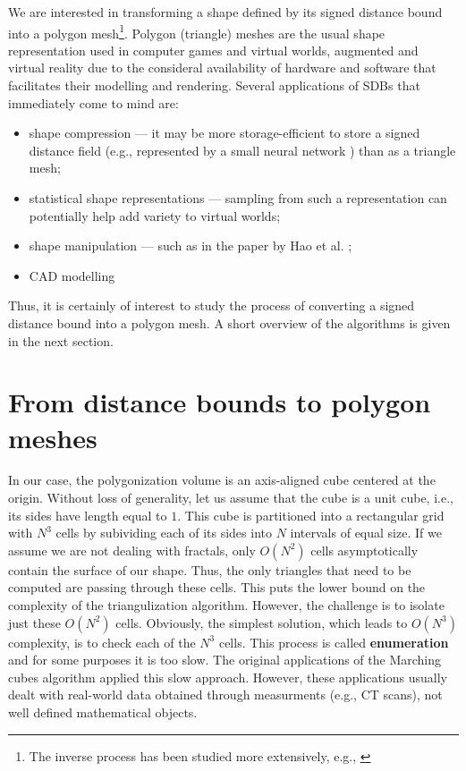 \documentclass[11pt,twocolumn]{article}
\begin{document}
		We are interested in transforming a shape defined by its signed distance bound into a polygon mesh\footnote{The inverse process has been studied more extensively, e.g., \cite{DoubleLayerSDF,GenShapeCVPR2019}}.
		Polygon (triangle) meshes are the usual shape representation used in computer games and virtual worlds, augmented and virtual reality due to the consideral availability of hardware and software that facilitates their modelling and rendering.
		Several applications of SDBs that immediately come to mind are:
		\begin{itemize}
			\item
				shape compression --- it may be more storage-efficient to store a signed distance field (e.g., represented by a small neural network \cite{davies2020overfit}) than as a triangle mesh;
			\item
				statistical shape representations --- sampling from such a representation \cite{GenShapeCVPR2019} can potentially help add variety to virtual worlds;
			\item
				shape manipulation --- such as in the paper by Hao et al. \cite{hao2020dualsdf};
			\item
				CAD modelling
		\end{itemize}
		Thus, it is certainly of interest to study the process of converting a signed distance bound into a polygon mesh.
		A short overview of the algorithms is given in the next section.

	\section{From distance bounds to polygon meshes}\label{sec:overview}
		In our case, the polygonization volume is an axis-aligned cube centered at the origin.
		Without loss of generality, let us assume that the cube is a unit cube, i.e., its sides have length equal to $1$.
		This cube is partitioned into a rectangular grid with $N^3$ cells by subividing each of its sides into $N$ intervals of equal size.
		If we assume we are not dealing with fractals, only $O(N^2)$ cells asymptotically contain the surface of our shape.
		Thus, the only triangles that need to be computed are passing through these cells.
		This puts the lower bound on the complexity of the triangulization algorithm.
		However, the challenge is to isolate just these $O(N^2)$ cells.
		Obviously, the simplest solution, which leads to $O(N^3)$ complexity, is to check each of the $N^3$ cells.
		This process is called \textbf{enumeration} \cite{unchainedgeometry} and for some purposes it is too slow.
		The original applications of the Marching cubes algorithm \cite{LorensenCline87marchingcubes} applied this slow approach.
		However, these applications usually dealt with real-world data obtained through measurments (e.g., CT scans), not well defined mathematical objects.
\end{document}
